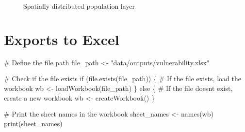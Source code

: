 \documentclass[
  letterpaper,
  DIV=11,
  numbers=noendperiod]{scrartcl}
\newenvironment{Shaded}{}{}
\newcommand{\CommentTok}[1]{\textcolor[rgb]{0.42,0.45,0.49}{#1}}
\newcommand{\ControlFlowTok}[1]{\textcolor[rgb]{0.84,0.23,0.29}{#1}}
\newcommand{\FunctionTok}[1]{\textcolor[rgb]{0.44,0.26,0.76}{#1}}
\newcommand{\NormalTok}[1]{\textcolor[rgb]{0.14,0.16,0.18}{#1}}
\newcommand{\OtherTok}[1]{\textcolor[rgb]{0.44,0.26,0.76}{#1}}
\newcommand{\StringTok}[1]{\textcolor[rgb]{0.01,0.18,0.38}{#1}}
\begin{document}
\begin{figure}[H]


\caption{\label{fig-gridded-population}Spatially distributed population
layer}

\end{figure}%

\section{Exports to Excel}\label{exports-to-excel}

\begin{Shaded}
\begin{Highlighting}[]
\CommentTok{\# Define the file path}
\NormalTok{file\_path }\OtherTok{\textless{}{-}} \StringTok{"data/outputs/vulnerability.xlsx"}

\CommentTok{\# Check if the file exists}
\ControlFlowTok{if}\NormalTok{ (}\FunctionTok{file.exists}\NormalTok{(file\_path)) \{}
  \CommentTok{\# If the file exists, load the workbook}
\NormalTok{  wb }\OtherTok{\textless{}{-}} \FunctionTok{loadWorkbook}\NormalTok{(file\_path)}
\NormalTok{\} }\ControlFlowTok{else}\NormalTok{ \{}
  \CommentTok{\# If the file doesn\textquotesingle{}t exist, create a new workbook}
\NormalTok{  wb }\OtherTok{\textless{}{-}} \FunctionTok{createWorkbook}\NormalTok{()}
\NormalTok{\}}

\CommentTok{\# Print the sheet names in the workbook}
\NormalTok{sheet\_names }\OtherTok{\textless{}{-}} \FunctionTok{names}\NormalTok{(wb)}
\FunctionTok{print}\NormalTok{(sheet\_names)}
\end{Highlighting}
\end{Shaded}
\end{document}
